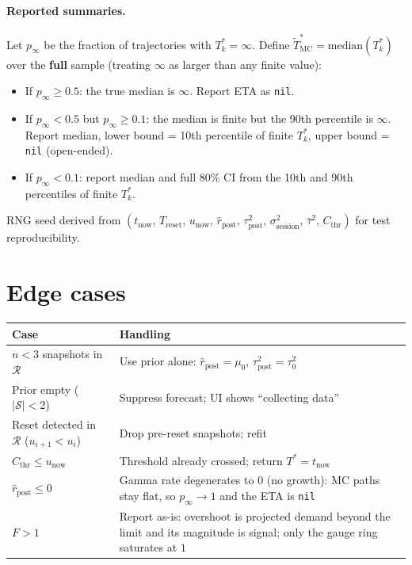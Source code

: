 \documentclass[11pt]{article}
\newcommand{\rpost}{\hat r_{\text{post}}}
\newcommand{\taupostsq}{\tau_{\text{post}}^2}
\newcommand{\tauzerosq}{\tau_0^2}
\newcommand{\sigsessionsq}{\sigma_{\text{session}}^2}
\newcommand{\unow}{u_{\text{now}}}
\newcommand{\tnow}{t_{\text{now}}}
\newcommand{\Treset}{T_{\text{reset}}}
\newcommand{\Cthr}{C_{\text{thr}}}
\newcommand{\Tstar}{T^\ast}
\newcommand{\Tstark}{T^\ast_k}
\begin{document}
\paragraph{Reported summaries.} Let $p_\infty$ be the fraction of
trajectories with $\Tstark = \infty$. Define $\tilde\Tstar_{\text{MC}} =
\mathrm{median}(\Tstark)$ over the \textbf{full} sample (treating $\infty$
as larger than any finite value):

\begin{itemize}
  \item If $p_\infty \geq 0.5$: the true median is $\infty$. Report ETA as
    \texttt{nil}.
  \item If $p_\infty < 0.5$ but $p_\infty \geq 0.1$: the median is finite
    but the 90th percentile is $\infty$. Report median, lower bound = 10th
    percentile of finite $\Tstark$, upper bound = \texttt{nil}
    (open-ended).
  \item If $p_\infty < 0.1$: report median and full 80\% CI from the 10th
    and 90th percentiles of finite $\Tstark$.
\end{itemize}

RNG seed derived from $(\tnow,\, \Treset,\, \unow,\, \rpost,\, \taupostsq,\,
\sigsessionsq,\, \bar\tau^2,\, \Cthr)$ for test reproducibility.

\section{Edge cases}

\begin{center}
\begin{tabular}{@{}p{}p{}@{}}
\toprule
Case & Handling \\
\midrule
$n < 3$ snapshots in $\mathcal{R}$
  & Use prior alone: $\rpost = \mu_0$, $\taupostsq = \tauzerosq$ \\
Prior empty ($\lvert\mathcal{S}\rvert < 2$)
  & Suppress forecast; UI shows ``collecting data'' \\
Reset detected in $\mathcal{R}$ ($u_{i+1} < u_i$)
  & Drop pre-reset snapshots; refit \\
$\Cthr \leq \unow$
  & Threshold already crossed; return $\Tstar = \tnow$ \\
$\rpost \leq 0$
  & Gamma rate degenerates to $0$ (no growth): MC paths stay flat, so
    $p_\infty \to 1$ and the ETA is \texttt{nil} \\
$F > 1$
  & Report as-is: overshoot is projected demand beyond the limit and its
    magnitude is signal; only the gauge ring saturates at $1$ \\
\bottomrule
\end{tabular}
\end{center}
\end{document}
